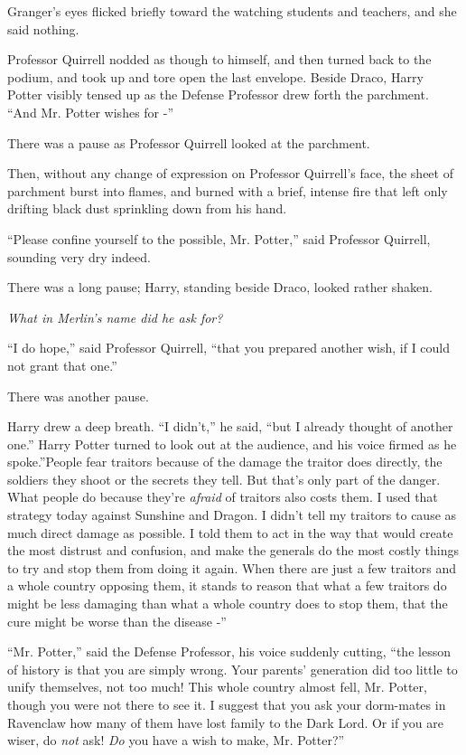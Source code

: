 Granger's eyes flicked briefly toward the watching students and
teachers, and she said nothing.

Professor Quirrell nodded as though to himself, and then turned back to
the podium, and took up and tore open the last envelope. Beside Draco,
Harry Potter visibly tensed up as the Defense Professor drew forth the
parchment. ``And Mr. Potter wishes for -''

There was a pause as Professor Quirrell looked at the parchment.

Then, without any change of expression on Professor Quirrell's face, the
sheet of parchment burst into flames, and burned with a brief, intense
fire that left only drifting black dust sprinkling down from his hand.

``Please confine yourself to the possible, Mr. Potter,'' said Professor
Quirrell, sounding very dry indeed.

There was a long pause; Harry, standing beside Draco, looked rather
shaken.

\emph{What in Merlin's name did he ask for?}

``I do hope,'' said Professor Quirrell, ``that you prepared another
wish, if I could not grant that one.''

There was another pause.

Harry drew a deep breath. ``I didn't,'' he said, ``but I already thought
of another one.'' Harry Potter turned to look out at the audience, and
his voice firmed as he spoke.''People fear traitors because of the
damage the traitor does directly, the soldiers they shoot or the secrets
they tell. But that's only part of the danger. What people do because
they're \emph{afraid} of traitors also costs them. I used that strategy
today against Sunshine and Dragon. I didn't tell my traitors to cause as
much direct damage as possible. I told them to act in the way that would
create the most distrust and confusion, and make the generals do the
most costly things to try and stop them from doing it again. When there
are just a few traitors and a whole country opposing them, it stands to
reason that what a few traitors do might be less damaging than what a
whole country does to stop them, that the cure might be worse than the
disease -''

``Mr. Potter,'' said the Defense Professor, his voice suddenly cutting,
``the lesson of history is that you are simply wrong. Your parents'
generation did too little to unify themselves, not too much! This whole
country almost fell, Mr. Potter, though you were not there to see it. I
suggest that you ask your dorm-mates in Ravenclaw how many of them have
lost family to the Dark Lord. Or if you are wiser, do \emph{not} ask!
\emph{Do} you have a wish to make, Mr. Potter?''

